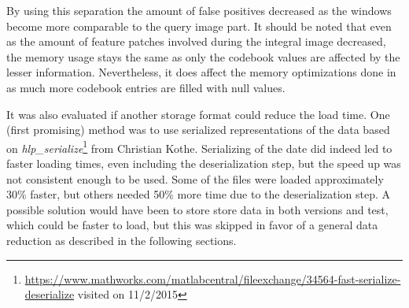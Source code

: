 By using this separation the amount of false positives decreased as the windows become more comparable to the query image part. It should be noted that even as the amount of feature patches involved during the integral image decreased, the memory usage stays the same as only the codebook values are affected by the lesser information. Nevertheless, it does affect the memory optimizations done in  as much more codebook entries are filled with null values.

It was also evaluated if another storage format could reduce the load time. One (first promising) method was to use serialized representations of the data based on \textit{hlp\_serialize}\footnote{\url{https://www.mathworks.com/matlabcentral/fileexchange/34564-fast-serialize-deserialize} visited on 11/2/2015} from Christian Kothe. Serializing of the date did indeed led to faster loading times, even including the deserialization step, but the speed up was not consistent enough to be used. Some of the files were loaded approximately 30\% faster, but others needed 50\% more time due to the deserialization step. A possible solution would have been to store store data in both versions and test, which could be faster to load, but this was skipped in favor of a general data reduction as described in the following sections.
